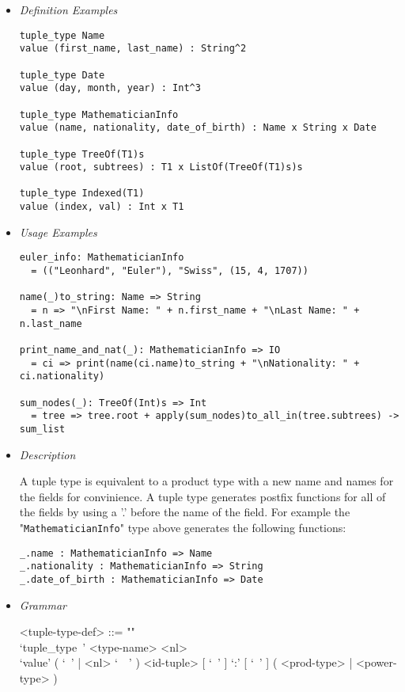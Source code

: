 \documentclass{article}
\begin{document}
\begin{itemize}
\item \textit{Definition Examples}

\begin{verbatim}
tuple_type Name
value (first_name, last_name) : String^2

tuple_type Date
value (day, month, year) : Int^3

tuple_type MathematicianInfo
value (name, nationality, date_of_birth) : Name x String x Date

tuple_type TreeOf(T1)s
value (root, subtrees) : T1 x ListOf(TreeOf(T1)s)s

tuple_type Indexed(T1)
value (index, val) : Int x T1
\end{verbatim}

\item \textit{Usage Examples}

\begin{verbatim}
euler_info: MathematicianInfo
  = (("Leonhard", "Euler"), "Swiss", (15, 4, 1707))

name(_)to_string: Name => String
  = n => "\nFirst Name: " + n.first_name + "\nLast Name: " + n.last_name

print_name_and_nat(_): MathematicianInfo => IO
  = ci => print(name(ci.name)to_string + "\nNationality: " + ci.nationality)

sum_nodes(_): TreeOf(Int)s => Int
  = tree => tree.root + apply(sum_nodes)to_all_in(tree.subtrees) -> sum_list
\end{verbatim}

\item \textit{Description}

A tuple type is equivalent to a product type with a new name  and names for the
fields for convinience. A tuple type generates postfix functions for all of
the fields by using a '.' before the name of the field. For example the
"\verb|MathematicianInfo|" type above generates the following functions:
\begin{verbatim}
_.name : MathematicianInfo => Name
_.nationality : MathematicianInfo => String
_.date_of_birth : MathematicianInfo => Date
\end{verbatim}

\newpage

\item \textit{Grammar}

\begin{grammar}
<tuple-type-def> ::= ""\\
`tuple_type\ ' <type-name> <nl> \\
`value' ( `\ ' | <nl> `\ \ ' )
<id-tuple> [ `\ ' ] `:' [ `\ ' ] ( <prod-type> | <power-type> )


\end{grammar}
\end{itemize}
\end{document}
